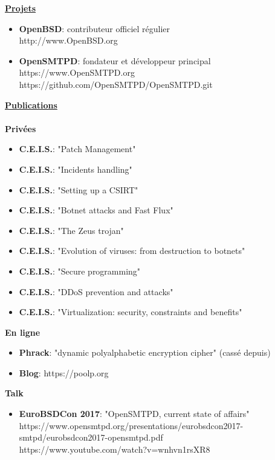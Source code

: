 \documentclass[a4paper,10pt]{letter}
\begin{document}
\pagebreak

\underline{\textbf{Projets}}\\
\begin{itemize}
\item	\textbf{OpenBSD}: contributeur officiel r\'egulier\\
  http://www.OpenBSD.org\\
\item	\textbf{OpenSMTPD}: fondateur et d\'eveloppeur principal\\
  https://www.OpenSMTPD.org\\
  https://github.com/OpenSMTPD/OpenSMTPD.git\\
\end{itemize}

\underline{\textbf{Publications}}\\
\\
\textbf{Priv\'ees}
\begin{itemize}
\item	\textbf{C.E.I.S.}: "Patch Management"
\item	\textbf{C.E.I.S.}: "Incidents handling"
\item	\textbf{C.E.I.S.}: "Setting up a CSIRT"
\item	\textbf{C.E.I.S.}: "Botnet attacks and Fast Flux"
\item	\textbf{C.E.I.S.}: "The Zeus trojan"
\item	\textbf{C.E.I.S.}: "Evolution of viruses: from destruction to botnets"
\item	\textbf{C.E.I.S.}: "Secure programming"
\item	\textbf{C.E.I.S.}: "DDoS prevention and attacks"
\item	\textbf{C.E.I.S.}: "Virtualization: security, constraints and benefits"\\
\end{itemize}

\textbf{En ligne}
\begin{itemize}
\item	\textbf{Phrack}: "dynamic polyalphabetic encryption cipher" (cass\'e depuis)
\item	\textbf{Blog}: https://poolp.org\\
\end{itemize}

\textbf{Talk}
\begin{itemize}
\item	\textbf{EuroBSDCon 2017}: "OpenSMTPD, current state of affairs"\\
  https://www.opensmtpd.org/presentations/eurobsdcon2017-smtpd/eurobsdcon2017-opensmtpd.pdf\\
  https://www.youtube.com/watch?v=wnhvn1rsXR8\\
\end{itemize}
\end{document}
